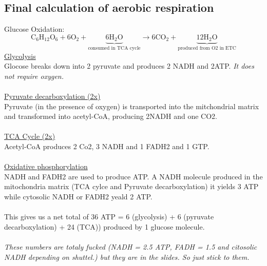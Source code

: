 \documentclass[../main.tex]{subfiles}
\begin{document}
\subsection{Final calculation of aerobic respiration}
\noindent
Glucose Oxidation: 
\[
\text{C}_6\text{H}_{12}\text{O}_6 + 6\text{O}_2 + \underbrace{6\text{H}_2\text{O}}_{\text{consumed in TCA cycle}}
\longrightarrow
6\text{CO}_2 + \underbrace{12\text{H}_2\text{O}}_{\text{produced from O2 in ETC}}
\]
\noindent
\underline{Glycolysis}\\
Glocose breaks down into 2 pyruvate and produces 2 NADH and 2ATP. \textit{It does not require oxygen.} \\
\\
\underline{Pyruvate decarboxylation (2x)}\\
Pyruvate (in the presence of oxygen) is transported into the mitchondrial matrix and transformed into acetyl-CoA, producing 2NADH and one CO2.\\
\\
\underline{TCA Cycle (2x)}\\
Acetyl-CoA produces 2 Co2, 3 NADH and 1 FADH2 and 1 GTP.\\
\\
\underline{Oxidative phosphorylation}\\
NADH and FADH2 are used to produce ATP. A NADH molecule produced in the mitochondria matrix (TCA cylce and Pyruvate decarboxylation) it yields 3 ATP while cytosolic NADH or FADH2 yeald 2 ATP. \\
\\
This gives us a net total of 36 ATP = 6 (glycolysis) + 6 (pyruvate decarboxylation) + 24 (TCA)) produced by 1 glucose molecule. \\
\\
\textit{These numbers are totaly fucked (NADH = 2.5 ATP, FADH = 1.5 and citosolic NADH depending on shuttel.) but they are in the slides. So just stick to them. }
\end{document}
